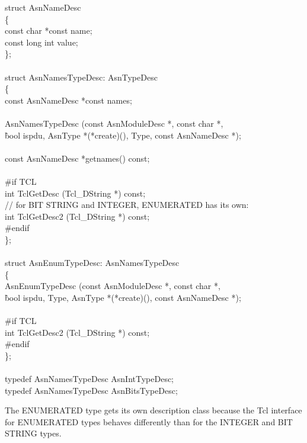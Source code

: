 \begin{Ccode}
struct AsnNameDesc\\
\{\+\\
  const char			\>\>*const name;\\
  const long int		\>\>value;\-\\
\};\\
\\
struct AsnNamesTypeDesc: AsnTypeDesc\\
\{\+\\
  const AsnNameDesc		\>\>*const names;\\
\\
				\>\>AsnNamesTypeDesc (const AsnModuleDesc *, const char *,\\
					\`bool ispdu, AsnType *(*create)(), Type, const AsnNameDesc *);\\
\\
  const AsnNameDesc		\>\>*getnames() const;\\
\\
\<\#if TCL\\
  int				\>\>TclGetDesc (Tcl\_DString *) const;\\
  // for BIT STRING and INTEGER, ENUMERATED has its own:\\
  int				\>\>TclGetDesc2 (Tcl\_DString *) const;\-\\
\#endif\\
\};\\
\\
struct AsnEnumTypeDesc: AsnNamesTypeDesc\\
\{\\
  \>				\>\>AsnEnumTypeDesc (const AsnModuleDesc *, const char *,\\
					\`bool ispdu, Type, AsnType *(*create)(), const AsnNameDesc *);\\
\\
\#if TCL\\
  \>int				\>\>TclGetDesc2 (Tcl\_DString *) const;\\
\#endif\\
\};\\
\\
typedef AsnNamesTypeDesc	\>\>\>AsnIntTypeDesc;\\
typedef AsnNamesTypeDesc	\>\>\>AsnBitsTypeDesc;
\end{Ccode}

The ENUMERATED type gets its own description class because the Tcl interface for ENUMERATED types behaves differently than for the INTEGER and BIT STRING types.

